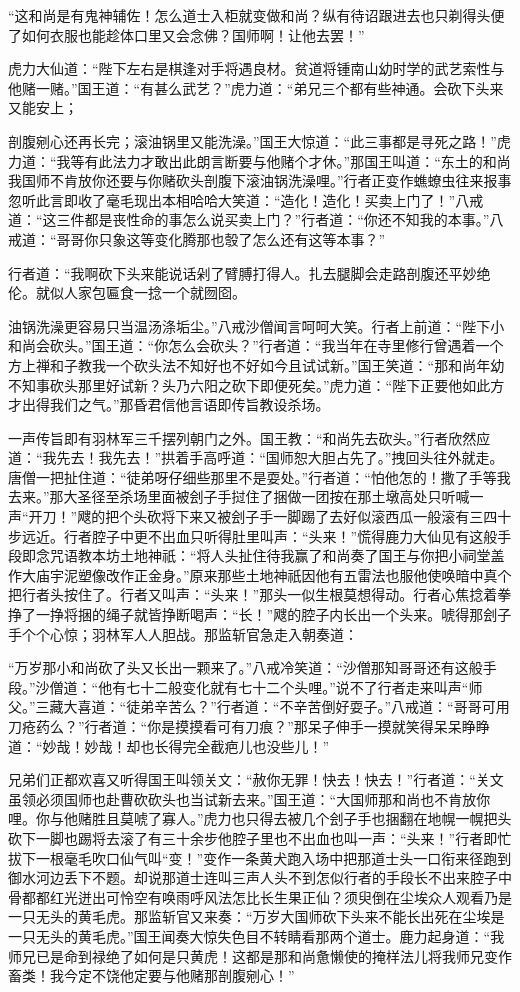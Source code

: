 \documentclass[12pt,UTF8]{ctexbook}
\begin{document}
{“这和尚是有鬼神辅佐！怎么道士入柜就变做和尚？纵有待诏跟进去也只剃得头便了如何衣服也能趁体口里又会念佛？国师啊！让他去罢！”

虎力大仙道：“陛下左右是棋逢对手将遇良材。贫道将锺南山幼时学的武艺索性与他赌一赌。”国王道：“有甚么武艺？”虎力道：“弟兄三个都有些神通。会砍下头来又能安上；

剖腹剜心还再长完；滚油锅里又能洗澡。”国王大惊道：“此三事都是寻死之路！”虎力道：“我等有此法力才敢出此朗言断要与他赌个才休。”那国王叫道：“东土的和尚我国师不肯放你还要与你赌砍头剖腹下滚油锅洗澡哩。”行者正变作蟭蟟虫往来报事忽听此言即收了毫毛现出本相哈哈大笑道：“造化！造化！买卖上门了！”八戒道：“这三件都是丧性命的事怎么说买卖上门？”行者道：“你还不知我的本事。”八戒道：“哥哥你只象这等变化腾那也彀了怎么还有这等本事？”

行者道：“我啊砍下头来能说话剁了臂膊打得人。扎去腿脚会走路剖腹还平妙绝伦。就似人家包匾食一捻一个就囫囵。

油锅洗澡更容易只当温汤涤垢尘。”八戒沙僧闻言呵呵大笑。行者上前道：“陛下小和尚会砍头。”国王道：“你怎么会砍头？”行者道：“我当年在寺里修行曾遇着一个方上禅和子教我一个砍头法不知好也不好如今且试试新。”国王笑道：“那和尚年幼不知事砍头那里好试新？头乃六阳之砍下即便死矣。”虎力道：“陛下正要他如此方才出得我们之气。”那昏君信他言语即传旨教设杀场。

一声传旨即有羽林军三千摆列朝门之外。国王教：“和尚先去砍头。”行者欣然应道：“我先去！我先去！”拱着手高呼道：“国师恕大胆占先了。”拽回头往外就走。唐僧一把扯住道：“徒弟呀仔细些那里不是耍处。”行者道：“怕他怎的！撒了手等我去来。”那大圣径至杀场里面被刽子手挝住了捆做一团按在那土墩高处只听喊一声“开刀！”飕的把个头砍将下来又被刽子手一脚踢了去好似滚西瓜一般滚有三四十步远近。行者腔子中更不出血只听得肚里叫声：“头来！”慌得鹿力大仙见有这般手段即念咒语教本坊土地神祇：“将人头扯住待我赢了和尚奏了国王与你把小祠堂盖作大庙宇泥塑像改作正金身。”原来那些土地神祇因他有五雷法也服他使唤暗中真个把行者头按住了。行者又叫声：“头来！”那头一似生根莫想得动。行者心焦捻着拳挣了一挣将捆的绳子就皆挣断喝声：“长！”飕的腔子内长出一个头来。唬得那刽子手个个心惊；羽林军人人胆战。那监斩官急走入朝奏道：

“万岁那小和尚砍了头又长出一颗来了。”八戒冷笑道：“沙僧那知哥哥还有这般手段。”沙僧道：“他有七十二般变化就有七十二个头哩。”说不了行者走来叫声“师父。”三藏大喜道：“徒弟辛苦么？”行者道：“不辛苦倒好耍子。”八戒道：“哥哥可用刀疮药么？”行者道：“你是摸摸看可有刀痕？”那呆子伸手一摸就笑得呆呆睁睁道：“妙哉！妙哉！却也长得完全截疤儿也没些儿！”

兄弟们正都欢喜又听得国王叫领关文：“赦你无罪！快去！快去！”行者道：“关文虽领必须国师也赴曹砍砍头也当试新去来。”国王道：“大国师那和尚也不肯放你哩。你与他赌胜且莫唬了寡人。”虎力也只得去被几个刽子手也捆翻在地幌一幌把头砍下一脚也踢将去滚了有三十余步他腔子里也不出血也叫一声：“头来！”行者即忙拔下一根毫毛吹口仙气叫“变！”变作一条黄犬跑入场中把那道士头一口衔来径跑到御水河边丢下不题。却说那道士连叫三声人头不到怎似行者的手段长不出来腔子中骨都都红光迸出可怜空有唤雨呼风法怎比长生果正仙？须臾倒在尘埃众人观看乃是一只无头的黄毛虎。那监斩官又来奏：“万岁大国师砍下头来不能长出死在尘埃是一只无头的黄毛虎。”国王闻奏大惊失色目不转睛看那两个道士。鹿力起身道：“我师兄已是命到禄绝了如何是只黄虎！这都是那和尚惫懒使的掩样法儿将我师兄变作畜类！我今定不饶他定要与他赌那剖腹剜心！”

}
\end{document}
